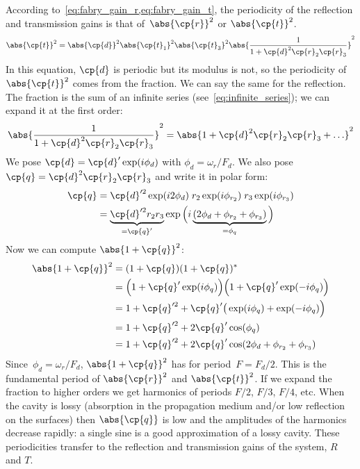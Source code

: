 According to~\cref{eq:fabry_gain_r,eq:fabry_gain_t},
the periodicity of the reflection and transmission gains is that of~$\abs{\cp{r}}^2$ or $\abs{\cp{t}}^2$.
\begin{equation}
    \abs{\cp{t}}^2 = \abs{\cp{d}}^2 \abs{\cp{t}_1}^2 \abs{\cp{t}_3}^2
    \abs{
        \frac{1}{1 + \cp{d}^2 \cp{r}_2 \cp{r}_3}
    }^2
    \label{eq:fabry_gain_r2_r3}
\end{equation}
In this equation, $\cp{d}$ is periodic but its modulus is not,
so the periodicity of~$\abs{\cp{t}}^2$ comes from the fraction.
We can say the same for the reflection.
The fraction is the sum of an infinite series (see~\cref{eq:infinite_series}); we can expand it at the first order:
\begin{equation}
    \abs{
        \frac{1}{1 + \cp{d}^2 \cp{r}_2 \cp{r}_3}
    }^2
    =
    \abs{
        1 + \cp{d}^2 \cp{r}_2 \cp{r}_3 + \ldots
    }^2
\end{equation}
We pose
$\cp{d} = \cp{d}' \exp(i\phi_d)$ with $\phi_d = \omega_r/F_d$.
We also pose
$\cp{q} = \cp{d}^2 \cp{r}_2 \cp{r}_3$ and write it in polar form:
\begin{align}
    \cp{q}
    &=
    \cp{d}'^2 \exp(i2\phi_d)    \;
    r_2 \exp(i\phi_{r_2}) \;
    r_3 \exp(i\phi_{r_3})
    \\
    &=
    \underbrace{\cp{d}'^2 r_2 r_3}_{=\cp{q}'}
    \exp
    \Big(
        i
        \underbrace{(2 \phi_d + \phi_{r_2} + \phi_{r_3})}_{=\phi_q}
    \Big)
\end{align}
Now we can compute $\abs{1+\cp{q}}^2$:
\begin{align}
    \abs{1+\cp{q}}^2
    &=
    (1+\cp{q}) (1+\cp{q})^*
    \\
    &=
    \Big(1 + \cp{q}' \exp(i\phi_q)\Big)
    \Big(1 + \cp{q}' \exp(-i\phi_q)\Big)
    \\
    &=
    1 + \cp{q}'^2 + \cp{q}' \big( \exp(i\phi_q) + \exp(-i\phi_q) \Big)
    \\
    &=
    1 + \cp{q}'^2 + 2\cp{q}' \cos(\phi_q)
    \\
    &=
    1 + \cp{q}'^2 + 2\cp{q}' \cos(2 \phi_d + \phi_{r_2} + \phi_{r_3})
\end{align}
Since~$\phi_d = \omega_r/F_d$, $\abs{1+\cp{q}}^2$ has for period~$F=F_d/2$.
This is the fundamental period of $\abs{\cp{r}}^2$ and $\abs{\cp{t}}^2$.
If we expand the fraction to higher orders
we get harmonics of periods $F/2$, $F/3$, $F/4$, etc.
When the cavity is lossy (absorption in the propagation medium and/or low reflection on the surfaces) then $\abs{\cp{q}}$ is low and the amplitudes of the harmonics decrease rapidly: a single sine is a good approximation of a lossy cavity.
These periodicities transfer to the reflection and transmission gains of the system, $R$ and $T$.

